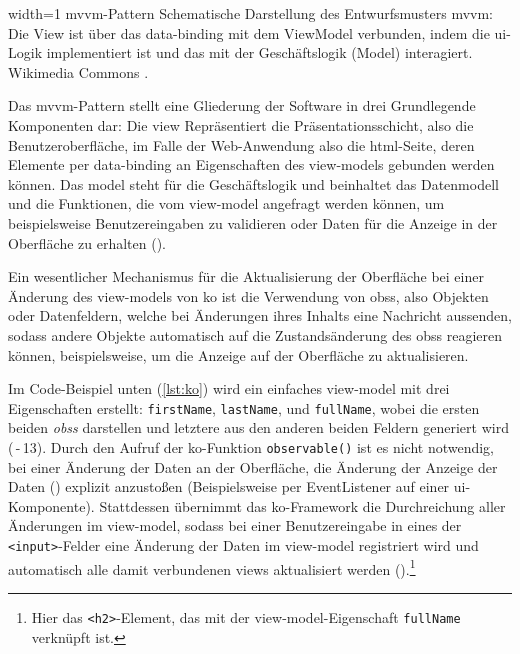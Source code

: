 	{width=1\textwidth}
	{\gls{mvvm}-Pattern}
		{Schematische Darstellung des Entwurfsmusters \gls{mvvm}: Die View ist über das \gls{data-binding} mit dem ViewModel verbunden, indem die \gls{ui}-Logik implementiert ist und das mit der Geschäftslogik (Model) interagiert.}
	{Wikimedia Commons \cite{MVVMPattern}.}


Das \gls{mvvm}-Pattern stellt eine Gliederung der Software in drei Grundlegende Komponenten dar:
Die \gls{view} Repräsentiert die Präsentationsschicht, also die Benutzeroberfläche, im Falle der Web-Anwendung also die \gls{html}-Seite, deren Elemente per \gls{data-binding} an Eigenschaften des \glspl{view-model} gebunden werden können. 
Das \gls{model} steht für die Geschäftslogik und beinhaltet das Datenmodell und die Funktionen, die vom \gls{view-model} angefragt werden können, um beispielsweise Benutzereingaben zu validieren oder Daten für die Anzeige in der Oberfläche zu erhalten ().

Ein wesentlicher Mechanismus für die Aktualisierung der Oberfläche bei einer Änderung des \glspl{view-model} von \gls{ko} ist die Verwendung von \glspl{obs}, also Objekten oder Datenfeldern, welche bei Änderungen ihres Inhalts eine Nachricht aussenden, sodass andere Objekte automatisch auf die Zustandsänderung des \glspl{obs} reagieren können, beispielsweise, um die Anzeige auf der Oberfläche zu aktualisieren.

Im Code-Beispiel unten (\autoref{lst:ko}) wird ein einfaches \gls{view-model} mit drei Eigenschaften erstellt: \lstinline|firstName|, \lstinline|lastName|, und \lstinline|fullName|, wobei die ersten beiden \emph{\glspl{obs}} darstellen und letztere aus den anderen beiden Feldern generiert wird (\,-\,13).
Durch den Aufruf der \gls{ko}-Funktion \lstinline|observable()| ist es nicht notwendig, bei einer Änderung der Daten an der Oberfläche, die Änderung der Anzeige der Daten () explizit anzustoßen (Beispielsweise per EventListener auf einer \gls{ui}-Komponente).
Stattdessen übernimmt das \gls{ko}-Framework die Durchreichung aller Änderungen im \gls{view-model}, sodass bei einer Benutzereingabe in eines der \lstinline|<input>|-Felder eine Änderung der Daten im \gls{view-model} registriert wird und automatisch alle damit verbundenen \glspl{view} aktualisiert werden ().\footnote{Hier das \texttt{<h2>}-Element, das mit der \gls{view-model}-Eigenschaft \texttt{fullName} verknüpft ist.}



